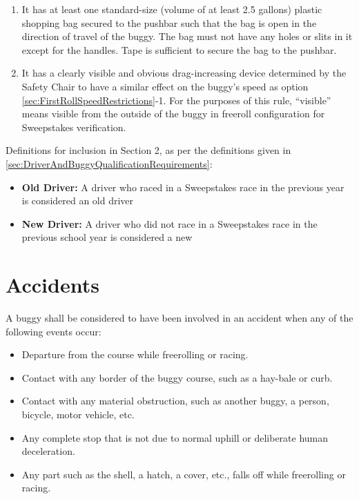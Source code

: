 	\begin{enumerate}
		\item It has at least one standard-size (volume of at least 2.5 gallons) plastic
		shopping bag secured to the pushbar such that the bag is open in the direction of
		travel of the buggy. The bag must not have any holes or slits in it except for
		the handles. Tape is sufficient to secure the bag to the pushbar.

		\item It has a clearly visible and obvious drag-increasing device determined by
		the Safety Chair to have a similar effect on the buggy's speed as option
		\ref{sec:FirstRollSpeedRestrictions}-1.
		For the purposes of this rule, “visible” means visible from the outside of the
		buggy in freeroll configuration for Sweepstakes verification.
	\end{enumerate}

	Definitions for inclusion in Section 2, as per the definitions given in
	\ref{sec:DriverAndBuggyQualificationRequirements}:

	\begin{itemize}
		\item {\bf Old Driver:} A driver who raced in a Sweepstakes race in the previous
		year is considered an old driver
		\item {\bf New Driver:} A driver who did not race in a Sweepstakes race in the
		previous school year is considered a new
	\end{itemize}


\section{Accidents}
\label{sec:Accidents}

	\noindent A buggy shall be considered to have been involved in an accident when any of the following events occur:

	\begin{itemize}
		\item Departure from the course while freerolling or racing.
		\item Contact with any border of the buggy course, such as a hay-bale or curb.
		\item Contact with any material obstruction, such as another buggy, a person, bicycle, motor vehicle, etc.
		\item Any complete stop that is not due to normal uphill or deliberate human deceleration.
		\item Any part such as the shell, a hatch, a cover, etc., falls	off while freerolling or racing.
	\end{itemize}

